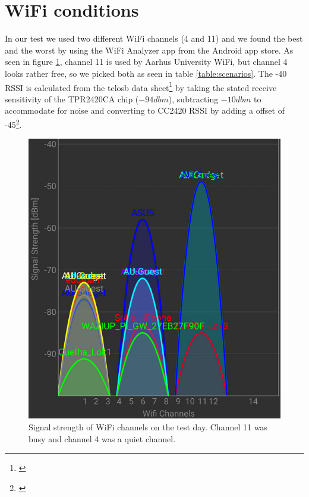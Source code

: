 \section{WiFi conditions}\label{sc:wifi}
In our test we used two different WiFi channels (4 and 11) and we found the best and the worst by using the WiFi Analyzer app from the Android app store\cite{Farproc@gmail.com2018}. As seen in figure \ref{fig:wifionthetestday}, channel 11 is used by Aarhus University WiFi, but channel 4 looks rather free, so we picked both as seen in table \ref{table:scenarios}. The -40 RSSI is calculated from the telosb data sheet\footnote{\cite{CrossbowTechnologyInc.2004}} by taking the stated receive sensitivity of the TPR2420CA chip ($-94dbm$), subtracting $-10dbm$ to accommodate for noise and converting to CC2420 RSSI by adding a offset of -45\footnote{\cite{Ieee}}.

\begin{figure}[h]
	\centering
	\includegraphics[width=1\linewidth]{testAndPerformance/wifi/wifiOnTheTestDay}
	\caption{Signal strength of WiFi channels on the test day. Channel 11 was busy and channel 4 was a quiet channel.}
	\label{fig:wifionthetestday}
\end{figure}
